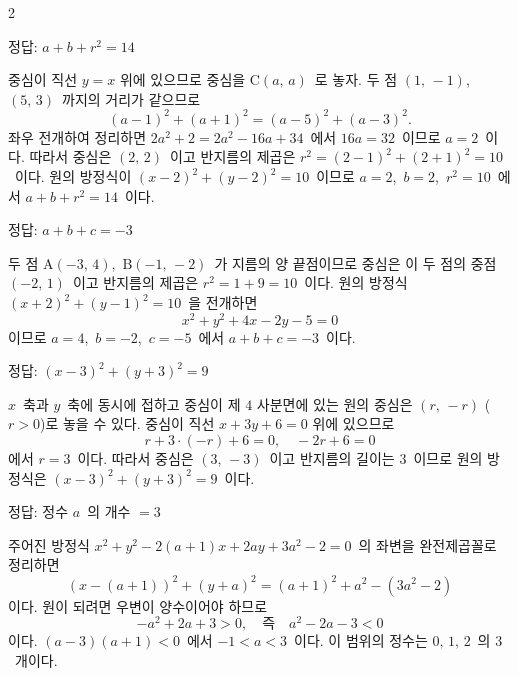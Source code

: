 \documentclass[10pt,fleqn]{article}
\begin{document}
\begin{multicols*}{2}

\begin{dmanswerbox}
정답: $a+b+r^2=14$
\end{dmanswerbox}

중심이 직선 $y = x$ 위에 있으므로 중심을 $\mathrm{C}(a,\, a)$\ 로 놓자. 두 점 $(1,\, -1)$,\ $(5,\, 3)$\ 까지의 거리가 같으므로
\[ (a-1)^2 + (a+1)^2 = (a-5)^2 + (a-3)^2. \]
좌우 전개하여 정리하면 $2a^2 + 2 = 2a^2 - 16a + 34$\ 에서 $16a = 32$\ 이므로 $a = 2$\ 이다. 따라서 중심은 $(2,\, 2)$\ 이고 반지름의 제곱은 $r^2 = (2-1)^2 + (2+1)^2 = 10$\ 이다. 원의 방정식이 $(x - 2)^2 + (y - 2)^2 = 10$\ 이므로 $a = 2$,\ $b = 2$,\ $r^2 = 10$\ 에서 $a + b + r^2 = 14$\ 이다.
\begin{dmanswerbox}
정답: $a+b+c=-3$
\end{dmanswerbox}

두 점 $\mathrm{A}(-3,\, 4)$,\ $\mathrm{B}(-1,\, -2)$\ 가 지름의 양 끝점이므로 중심은 이 두 점의 중점 $(-2,\, 1)$\ 이고 반지름의 제곱은 $r^2 = 1 + 9 = 10$\ 이다. 원의 방정식 $(x+2)^2 + (y-1)^2 = 10$\ 을 전개하면
\[ x^2 + y^2 + 4x - 2y - 5 = 0 \]
이므로 $a = 4$,\ $b = -2$,\ $c = -5$\ 에서 $a + b + c = -3$\ 이다.

\begin{dmanswerbox}
정답: $(x-3)^2+(y+3)^2=9$
\end{dmanswerbox}

$x$\ 축과 $y$\ 축에 동시에 접하고 중심이 제 $4$ 사분면에 있는 원의 중심은 $(r,\, -r)$ ($r > 0$)로 놓을 수 있다. 중심이 직선 $x + 3y + 6 = 0$ 위에 있으므로
\[ r + 3 \cdot (-r) + 6 = 0,\quad -2r + 6 = 0 \]
에서 $r = 3$\ 이다. 따라서 중심은 $(3,\, -3)$\ 이고 반지름의 길이는 $3$\ 이므로 원의 방정식은 $(x-3)^2 + (y+3)^2 = 9$\ 이다.

\begin{dmanswerbox}
정답: 정수 $a$\ 의 개수 $=3$
\end{dmanswerbox}

주어진 방정식 $x^2 + y^2 - 2(a+1)x + 2ay + 3a^2 - 2 = 0$\ 의 좌변을 완전제곱꼴로 정리하면
\[ (x - (a+1))^2 + (y + a)^2 = (a+1)^2 + a^2 - (3a^2 - 2) \]
이다. 원이 되려면 우변이 양수이어야 하므로
\[ -a^2 + 2a + 3 > 0,\quad \text{즉}\quad a^2 - 2a - 3 < 0 \]
이다. $(a-3)(a+1) < 0$\ 에서 $-1 < a < 3$\ 이다. 이 범위의 정수는 $0,\, 1,\, 2$\ 의 $3$\ 개이다.


\end{multicols*}
\end{document}
